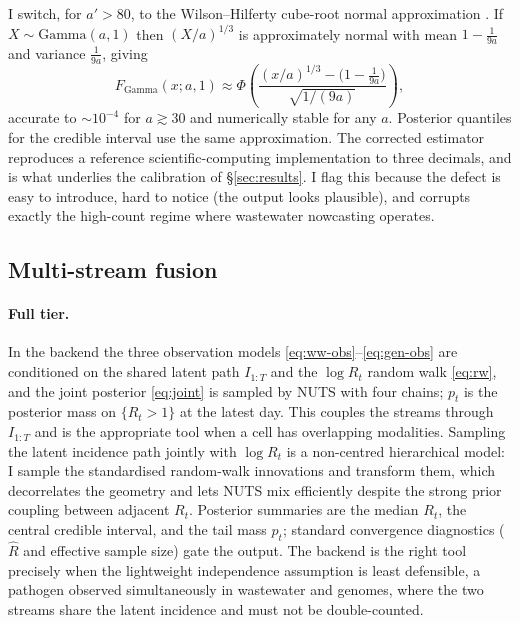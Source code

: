 \documentclass[10pt,twocolumn]{article}
\theoremstyle{definition}
\newcommand{\Rt}{R_t}
\newcommand{\Gam}{\mathrm{Gamma}}
\begin{document}
I switch, for $a'>80$, to the Wilson--Hilferty cube-root normal approximation
\citep{wilsonhilferty1931}. If $X\sim\Gam(a,1)$ then $(X/a)^{1/3}$ is
approximately normal with mean $1-\tfrac{1}{9a}$ and variance $\tfrac{1}{9a}$,
giving
\begin{equation}
F_{\Gam}(x;a,1)\approx\Phi\!\left(\frac{(x/a)^{1/3}-\big(1-\tfrac{1}{9a}\big)}{\sqrt{1/(9a)}}\right),
\label{eq:wh}
\end{equation}
accurate to $\sim10^{-4}$ for $a\gtrsim30$ and numerically stable for any $a$.
Posterior quantiles for the credible interval use the same approximation. The
corrected estimator reproduces a reference scientific-computing implementation to
three decimals, and is what underlies the calibration of \S\ref{sec:results}. I
flag this because the defect is easy to introduce, hard to notice (the output
looks plausible), and corrupts exactly the high-count regime where wastewater
nowcasting operates.

\subsection{Multi-stream fusion}
\label{sec:fusion}

\paragraph{Full tier.}
In the backend the three observation models
\eqref{eq:ww-obs}--\eqref{eq:gen-obs} are conditioned on the shared latent path
$I_{1:T}$ and the $\log\Rt$ random walk \eqref{eq:rw}, and the joint posterior
\eqref{eq:joint} is sampled by NUTS \citep{hoffman2014,phan2019} with four chains;
$p_t$ is the posterior mass on $\{\Rt>1\}$ at the latest day. This couples the
streams through $I_{1:T}$ and is the appropriate tool when a cell has overlapping
modalities. Sampling the latent incidence path jointly with $\log\Rt$ is a
non-centred hierarchical model: I sample the standardised random-walk innovations
and transform them, which decorrelates the geometry and lets NUTS mix efficiently
despite the strong prior coupling between adjacent $\Rt$. Posterior summaries are
the median $\Rt$, the central credible interval, and the tail mass $p_t$; standard
convergence diagnostics ($\hat R$ and effective sample size) gate the output. The
backend is the right tool precisely when the lightweight independence assumption
is least defensible, a pathogen observed simultaneously in wastewater and
genomes, where the two streams share the latent incidence and must not be
double-counted.
\end{document}

